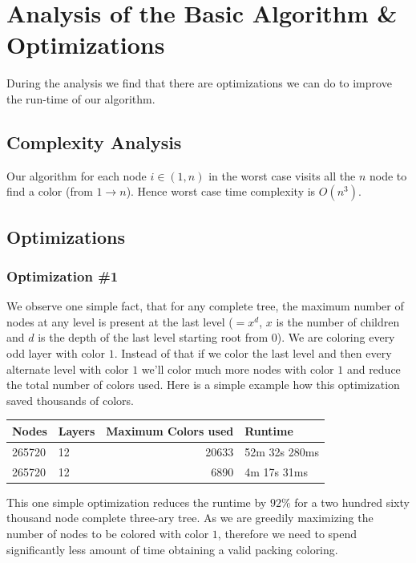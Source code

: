 \documentclass{article}
\theoremstyle{remark}
\begin{document}
\section{Analysis of the Basic Algorithm \& Optimizations}
During the analysis we find that there are optimizations we can do to improve the run-time of our algorithm.

\subsection{Complexity Analysis}
Our algorithm for each node $i \in (1, n)$ in the worst case visits all the $n$ node to find a color (from $1 \to n$). Hence worst case time complexity is $O(n^3)$.

\subsection{Optimizations}
\subsubsection{Optimization \#1}
We observe one simple fact, that for any complete tree, the maximum number of nodes at any level is present at the last level ($=x^d$, $x$ is the number of children and $d$ is the depth of the last level starting root from $0$). We are coloring every odd layer with color $1$. Instead of that if we color the last level and then every alternate level with color $1$ we'll color much more nodes with color $1$ and reduce the total number of colors used. Here is a simple example how this optimization saved thousands of colors.

\begin{table}[h]
    \centering
\begin{tabular}{|l|l|r|l|}
\hline
\multicolumn{1}{|l|}{Nodes} & \multicolumn{1}{l|}{Layers} & \multicolumn{1}{l|}{Maximum Colors used} & \multicolumn{1}{l|}{Runtime} \\ \hline
265720 & 12 & 20633 & 52m 32s 280ms \\ \hline
265720 & 12 & 6890 & 4m 17s 31ms \\ \hline
\end{tabular}
\end{table}

This one simple optimization reduces the runtime by $92\%$ for a two hundred sixty thousand node complete three-ary tree. As we are greedily maximizing the number of nodes to be colored with color $1$, therefore we need to spend significantly less amount of time obtaining a valid packing coloring.
\end{document}
